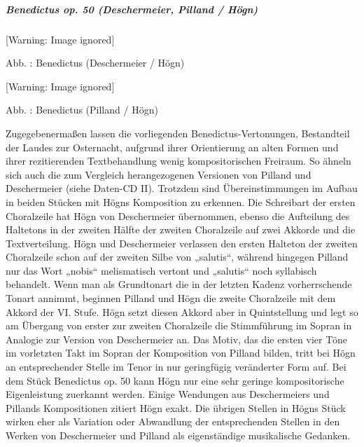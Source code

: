 \documentclass[a4paper]{article}
\newcounter{Abb}
\renewcommand\theAbb{\arabic{Abb}}
\begin{document}
\subparagraph[Benedictus op. 50 (Deschermeier, Pilland /
Högn)]{Benedictus op. 50 (Deschermeier, Pilland / Högn)}
  [Warning: Image ignored] %
 

Abb. \stepcounter{Abb}{\theAbb}: Benedictus (Deschermeier / Högn)

  [Warning: Image ignored] %
 

Abb. \stepcounter{Abb}{\theAbb}: Benedictus (Pilland / Högn)

Zugegebenermaßen lassen die vorliegenden Benedictus-Vertonungen,
Bestandteil der Laudes zur Osternacht, aufgrund ihrer Orientierung an
alten Formen und ihrer rezitierenden Textbehandlung wenig
kompositorischen Freiraum. So ähneln sich auch die zum Vergleich
herangezogenen Versionen von Pilland und Deschermeier (siehe Daten-CD
II). Trotzdem sind Übereinstimmungen im Aufbau in beiden Stücken mit
Högns Komposition zu erkennen. Die Schreibart der ersten Choralzeile
hat Högn von Deschermeier übernommen, ebenso die Aufteilung des
Haltetons in der zweiten Hälfte der zweiten Choralzeile auf zwei
Akkorde und die Textverteilung. Högn und Deschermeier verlassen den
ersten Halteton der zweiten Choralzeile schon auf der zweiten Silbe von
„salutis“, während hingegen Pilland nur das Wort „nobis“ melismatisch
vertont und „salutis“ noch syllabisch behandelt. Wenn man als
Grundtonart die in der letzten Kadenz vorherrschende Tonart annimmt,
beginnen Pilland und Högn die zweite Choralzeile mit dem Akkord der VI.
Stufe. Högn setzt diesen Akkord aber in Quintstellung und legt so am
Übergang von erster zur zweiten Choralzeile die Stimmführung im Sopran
in Analogie zur Version von Deschermeier an. Das Motiv, das die ersten
vier Töne im vorletzten Takt im Sopran der Komposition von Pilland
bilden, tritt bei Högn an entsprechender Stelle im Tenor in nur
geringfügig veränderter Form auf. Bei dem Stück Benedictus op. 50 kann
Högn nur eine sehr geringe kompositorische Eigenleistung zuerkannt
werden. Einige Wendungen aus Deschermeiers und Pillands Kompositionen
zitiert Högn exakt. Die übrigen Stellen in Högns Stück wirken eher als
Variation oder Abwandlung der entsprechenden Stellen in den Werken von
Deschermeier und Pilland als eigenständige musikalische Gedanken.
\end{document}
